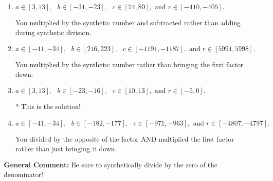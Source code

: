 \documentclass{extbook}[14pt]
\begin{document}
\begin{enumerate}
{\begin{enumerate}[label=\Alph*.]
 You divided by the opposite of the factor.
\item \( a \in [3, 13], \text{   } b \in [-31, -23], \text{   } c \in [74, 80], \text{   and   } r \in [-410, -405]. \)

 You multiplied by the synthetic number and subtracted rather than adding during synthetic division.
\item \( a \in [-41, -34], \text{   } b \in [216, 223], \text{   } c \in [-1191, -1187], \text{   and   } r \in [5991, 5998]. \)

 You multiplied by the synthetic number rather than bringing the first factor down.
\item \( a \in [3, 13], \text{   } b \in [-23, -16], \text{   } c \in [10, 13], \text{   and   } r \in [-5, 0]. \)

* This is the solution!
\item \( a \in [-41, -34], \text{   } b \in [-182, -177], \text{   } c \in [-971, -963], \text{   and   } r \in [-4807, -4797]. \)

 You divided by the opposite of the factor AND multiplied the first factor rather than just bringing it down.
\end{enumerate}

\textbf{General Comment:} Be sure to synthetically divide by the zero of the denominator!
}
\end{enumerate}
\end{document}
